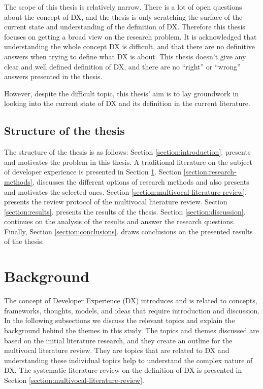 \documentclass[english, 12pt, a4paper, sci, utf8, a-1b, online]{aaltothesis}
\begin{document}
The scope of this thesis is relatively narrow. There is a lot of open questions about the concept of DX, and the thesis is only scratching the surface of the current state and understanding of the definition of DX. Therefore this thesis focuses on getting a broad view on the research problem. It is acknowledged that understanding the whole concept DX is difficult, and that there are no definitive answers when trying to define what DX is about. This thesis doesn't give any clear and well defined definition of DX, and there are no ``right'' or ``wrong'' answers presented in the thesis.

However, despite the difficult topic, this thesis' aim is to lay groundwork in looking into the current state of DX and its definition in the current literature.

\subsection{Structure of the thesis}

The structure of the thesis is as follows: Section \ref{section:introduction}. presents and motivates the problem in this thesis. A traditional literature on the subject of developer experience is presented in Section \ref{section:background}. Section \ref{section:research-methods}. discusses the different options of research methods and also presents and motivates the selected ones. Section \ref{section:multivocal-literature-review}. presents the review protocol of the multivocal literature review. Section \ref{section:results}. presents the results of the thesis. Section \ref{section:discussion}. continues on the analysis of the results and answer the research questions. Finally, Section \ref{section:conclusions}. draws conclusions on the presented results of the thesis.

\clearpage
\section{Background} \label{section:background}

The concept of Developer Experience (DX) introduces and is related to concepts, frameworks, thoughts, models, and ideas that require introduction and discussion. In the following subsections we discuss the relevant topics and explain the background behind the themes in this study. The topics and themes discussed are based on the initial literature research, and they create an outline for the multivocal literature review. They are topics that are related to DX and understanding these individual topics help to understand the complex nature of DX. The systematic literature review on the definition of DX is presented in Section \ref{section:multivocal-literature-review}.
\end{document}
